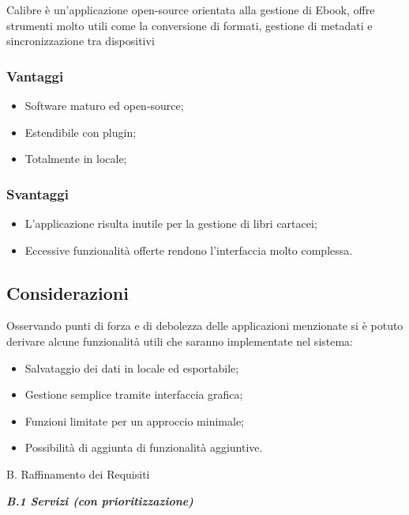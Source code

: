 \documentclass[a4paper,12pt]{report}
\begin{document}
Calibre è un'applicazione open-source orientata alla gestione di Ebook,
offre strumenti molto utili come la conversione di formati, gestione di
metadati e sincronizzazione tra dispositivi

\subsubsection{Vantaggi}\label{vantaggi-1}

\begin{itemize}
  \item
    Software maturo ed open-source;
  \item
    Estendibile con plugin;
  \item
    Totalmente in locale;
\end{itemize}

\subsubsection{Svantaggi}\label{svantaggi-1}

\begin{itemize}
  \item
    L'applicazione risulta inutile per la gestione di libri cartacei;
  \item
    Eccessive funzionalità offerte rendono l'interfaccia molto complessa.
\end{itemize}

\subsection{Considerazioni}\label{considerazioni}

Osservando punti di forza e di debolezza delle applicazioni menzionate
si è potuto derivare alcune funzionalità utili che saranno implementate
nel sistema:

\begin{itemize}
  \item
    Salvataggio dei dati in locale ed esportabile;
  \item
    Gestione semplice tramite interfaccia grafica;
  \item
    Funzioni limitate per un approccio minimale;
  \item
    Possibilità di aggiunta di funzionalità aggiuntive.
\end{itemize}

B. Raffinamento dei Requisiti

\emph{\textbf{B.1 Servizi (con prioritizzazione)}}
\end{document}
